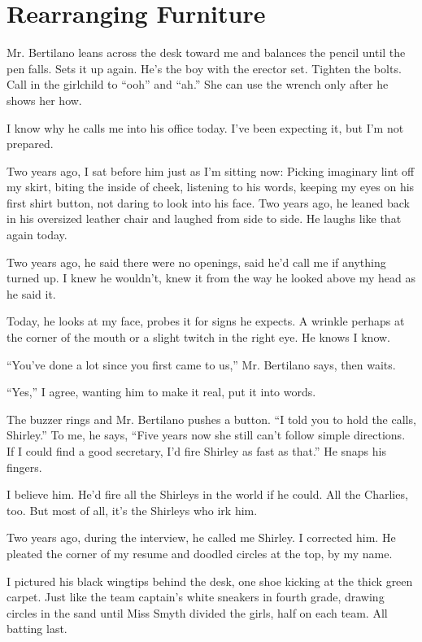 \documentclass[twoside,10pt]{book}
\begin{document}
\cleardoublepage
\chapter{Rearranging Furniture}

Mr. Bertilano leans across the desk toward me and balances the pencil
until the pen falls. Sets it up again. He's the boy with the erector
set. Tighten the bolts. Call in the girlchild to ``ooh'' and ``ah.'' She
can use the wrench only after he shows her how.

I know why he calls me into his office today. I've been expecting it,
but I'm not prepared.

Two years ago, I sat before him just as I'm sitting now: Picking
imaginary lint off my skirt, biting the inside of cheek, listening to
his words, keeping my eyes on his first shirt button, not daring to look
into his face. Two years ago, he leaned back in his oversized leather
chair and laughed from side to side. He laughs like that again today.

Two years ago, he said there were no openings, said he'd call me if
anything turned up. I knew he wouldn't, knew it from the way he looked
above my head as he said it.

Today, he looks at my face, probes it for signs he expects. A wrinkle
perhaps at the corner of the mouth or a slight twitch in the right eye.
He knows I know.

``You've done a lot since you first came to us,'' Mr. Bertilano says,
then waits.

``Yes,'' I agree, wanting him to make it real, put it into words.

The buzzer rings and Mr. Bertilano pushes a button. ``I told you to hold
the calls, Shirley.'' To me, he says, ``Five years now she still can't
follow simple directions. If I could find a good secretary, I'd fire
Shirley as fast as that.'' He snaps his fingers.

I believe him. He'd fire all the Shirleys in the world if he could. All
the Charlies, too. But most of all, it's the Shirleys who irk him.

Two years ago, during the interview, he called me Shirley. I corrected
him. He pleated the corner of my resume and doodled circles at the top,
by my name.

I pictured his black wingtips behind the desk, one shoe kicking at the
thick green carpet. Just like the team captain's white sneakers in
fourth grade, drawing circles in the sand until Miss Smyth divided the
girls, half on each team. All batting last.
\end{document}
